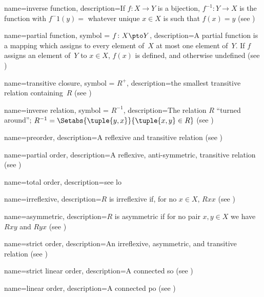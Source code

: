  {
  name=inverse function,
  description={If $f\colon X \to Y$ is a \gls{bijection}, $f^{-1} \colon
    Y \to X$ is the function with $f^-1(y) =$ whatever unique $x \in
    X$ is such that $f(x) = y$ (see )} }

 {
  name=partial function,
    symbol = {\ensuremath{f \colon X \pto Y}},
  description={A partial function is a mapping which assigns to every
    {element} of~$X$ at most one {element} of~$Y$. If $f$ assigns
    an element of~$Y$ to $x \in X$, $f(x)$ is defined, and otherwise
    undefined (see )} }

 {
  name=transitive closure,
  symbol = {\ensuremath{R^+}},
  description={the smallest \gls{transitive} relation containing~$R$
    (see )} }

 {
  name=inverse relation,
  symbol = {\ensuremath{R^{-1}}},  
  description={The relation $R$ ``turned around''; $R^{-1} =
    \Setabs{\tuple{y, x}}{\tuple{x, y} \in R}$ (see
    )} }

 {
  name=preorder,
  description={A \gls{reflexive} and \gls{transitive} relation (see
    )} }

 {
  name=partial order,
  description={A \gls{reflexive}, \gls{anti-symmetric},
    \gls{transitive} relation (see )} }

 {
  name=total order,
  description={see \gls{lo}}}

 {
  name=irreflexive,
  description={$R$ is irreflexive if, for no $x \in X$, $Rxx$ (see
    )} }

 {
  name=asymmetric,
  description={$R$ is asymmetric if for no pair $x,y\in X$ we have
    $Rxy$ and $Ryx$ (see )} }

 {
  name=strict order,
  description={An \gls{irreflexive}, \gls{asymmetric}, and
    \gls{transitive} relation (see )} }

 {
  name=strict linear order,
  description={A connected \gls{so} (see
    )} }

 {
  name=linear order,
  description={A connected \gls{po} (see
    )} }

